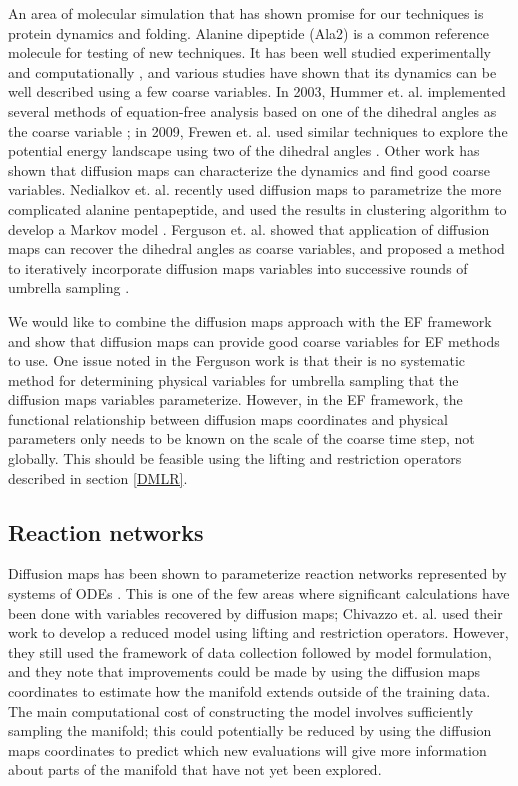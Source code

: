 \documentclass[12pt]{article}
\begin{document}
An area of molecular simulation that has shown promise for our techniques is protein dynamics and folding. Alanine dipeptide (Ala2) is a common reference molecule for testing of new techniques. It has been well studied experimentally and computationally \cite{Wang2014}, and various studies have shown that its dynamics can be well described using a few coarse variables. In 2003, Hummer et. al. implemented several methods of equation-free analysis based on one of the dihedral angles as the coarse variable \cite{Hummer2003}; in 2009, Frewen et. al. used similar techniques to explore the potential energy landscape using two of the dihedral angles \cite{Frewen2009}. Other work has shown that diffusion maps can characterize the dynamics and find good coarse variables. Nedialkov et. al. recently used diffusion maps to parametrize the more complicated alanine pentapeptide, and used the results in clustering algorithm to develop a Markov model \cite{Nedialkova2014}. Ferguson et. al. showed that application of diffusion maps can recover the dihedral angles as coarse variables, and proposed a method to iteratively incorporate diffusion maps variables into successive rounds of umbrella sampling \cite{Ferguson2011}. \vspace{1mm}

We would like to combine the diffusion maps approach with the EF framework and show that diffusion maps can provide good coarse variables for EF methods to use. One issue noted in the Ferguson work is that their is no systematic method for determining physical variables for umbrella sampling that the diffusion maps variables parameterize. However, in the EF framework, the functional relationship between diffusion maps coordinates and physical parameters only needs to be known on the scale of the coarse time step, not globally. This should be feasible using the lifting and restriction operators described in section \ref{DMLR}.

\subsection{Reaction networks}

Diffusion maps has been shown to parameterize reaction networks represented by systems of ODEs \cite{Chiavazzo2014}. This is one of the few areas where significant calculations have been done with variables recovered by diffusion maps; Chivazzo et. al. used their work to develop a reduced model using lifting and restriction operators. However, they still used the framework of data collection followed by model formulation, and they note that improvements could be made by using the diffusion maps coordinates to estimate how the manifold extends outside of the training data. The main computational cost of constructing the model involves sufficiently sampling the manifold; this could potentially be reduced by using the diffusion maps coordinates to predict which new evaluations will give more information about parts of the manifold that have not yet been explored. \vspace{1mm}
\end{document}

